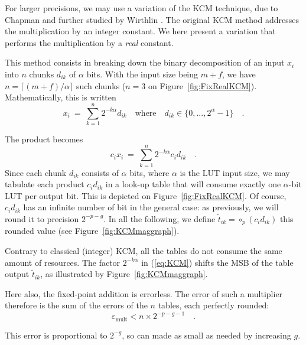 \documentclass[twocolumn]{IEEEtran}
\newcommand{\abserr}{\varepsilon}
\begin{document}
For larger precisions, we may use a variation of the KCM technique, due to Chapman  \cite{Chapman93:edn} and further studied by Wirthlin \cite{Wirthlin2004}.
The original KCM method addresses the multiplication by an integer constant.
We here present a variation that performs the multiplication by a \emph{real} constant.

This method  consists in breaking down the binary decomposition of an input $x_i$ into $n$ chunks $d_{ik}$ of $\alpha$ bits. 
With the input size being $m+f$,  we have $n=\lceil(m+f)/\alpha\rceil$ such chunks ($n=3$ on Figure~\ref{fig:FixRealKCM}). 
Mathematically, this is written
\begin{equation}
\displaystyle x_i\ =\ \sum_{k=1}^n 2^{-k\alpha}d_{ik}\quad \text{where}\quad d_{ik}\in\{0,...,2^\alpha-1\} \quad .
\label{eq:inputdec}
\end{equation}

The product becomes
\begin{equation}
\displaystyle c_ix_i\ =\ \sum_{k=1}^n 2^{-k\alpha} c_id_{ik} \quad .
\label{eq:KCM}
\end{equation}
Since each chunk $d_{ik}$ consists of $\alpha$ bits, where $\alpha$ is the LUT input size, we may tabulate each product $c_id_{ik}$ in a look-up table that will consume exactly one $\alpha$-bit LUT per output bit. 
This is depicted on Figure~\ref{fig:FixRealKCM}.
Of course, $c_id_{ik}$ has an infinite number of bit in the general case: as previously, we will round it to precision $2^{-p-g}$. 
In all the following, we define $\widetilde{t}_{ik}=\circ_p (c_id_{ik})$ this rounded value (see Figure~\ref{fig:KCMmaggraph}).

Contrary to classical (integer) KCM, all the tables do not consume the same amount of resources. 
The factor $2^{-k\alpha}$  in (\ref{eq:KCM}) shifts the MSB of the table output $\widetilde{t}_{ik}$, as illustrated by Figure~\ref{fig:KCMmaggraph}.


Here also, the fixed-point addition is errorless. 
The error of such a multiplier therefore is the sum of the errors of the $n$ tables, each perfectly rounded:  
\begin{equation}
\abserr_{\text{mult}} <n\times 2^{-p-g-1} \quad .
\label{eq:errorKCM}
\end{equation}

This error is proportional to $2^{-g}$, so can made as small as needed by increasing $g$.
\end{document}
